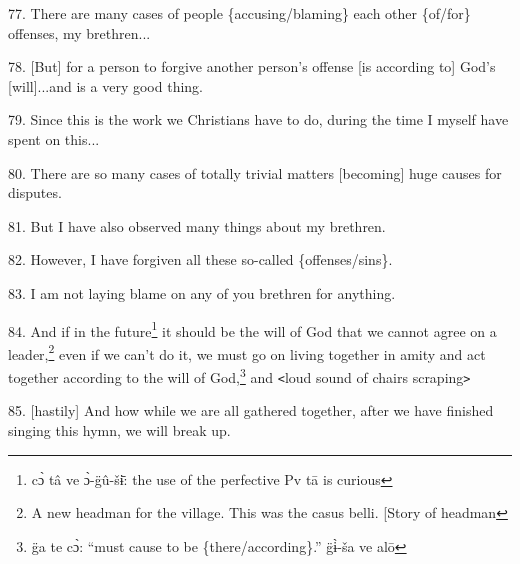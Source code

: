 77. There are many cases of people \{accusing/blaming\} each other \{of/for\} offenses,
my brethren...

78. [But] for a person to forgive another person's offense [is according to] God's
[will]...and is a very good thing.

79. Since this is the work we Christians have to do, during the time I myself have
spent on this...

80. There are so many cases of totally trivial matters [becoming] huge causes for
disputes.

81. But I have also observed many things about my brethren.

82. However, I have forgiven all these so-called \{offenses/sins\}.

83. I am not laying blame on any of you brethren for anything.

84. And if in the future\footnote{cɔ̀ tâ ve ɔ̀-g̈û-šɨ̄: the use of the perfective Pv tā is curious} it should be the will of God that we cannot agree on
a leader,\footnote{A new headman for the village. This was the casus belli. [Story of headman} even if we can't do it, we must go on living together in amity and
act together according to the will of God,\footnote{g̈a te cɔ̀: ``must cause to be \{there/according\}.'' g̈ɨ̀-ša ve alō} and \texttt{<}loud sound of chairs
scraping\texttt{>}

85. [hastily] And how while we are all gathered together, after we have finished
singing this hymn, we will break up.


